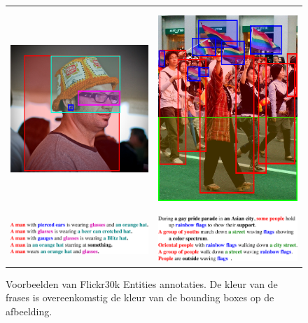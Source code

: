 \begin{figure}[!tb]
    \centering
    \begin{tabular}[t]{cc}
      \includegraphics[height=3.0in]{Images/example_hat.png} \vspace{-3mm}&
      \includegraphics[height=3.0in]{Images/example_parade.png}\\
      \includegraphics[valign = T,width=.4\columnwidth]{Images/example_hat_text.pdf}&
      \includegraphics[valign = T,width=.4\columnwidth]{Images/example_parade_text.pdf}
  \end{tabular}
\caption{Voorbeelden van Flickr30k Entities annotaties. De kleur van de frases is overeenkomstig de kleur van de bounding boxes op de afbeelding.\cite{Plummer2015}}
\label{fig:entities}
\end{figure}

